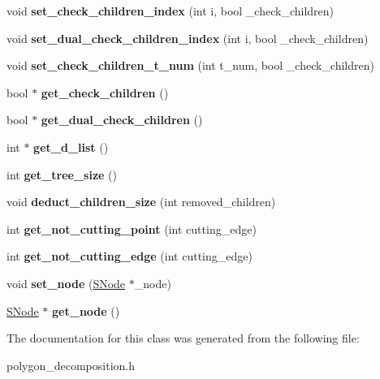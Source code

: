 \begin{DoxyCompactItemize}
\mbox{\label{class_triangle_aec7f124fbe54ae54fec82faf386d1aef}} 
void {\bfseries set\+\_\+check\+\_\+children\+\_\+index} (int i, bool \+\_\+check\+\_\+children)
\item 
\mbox{\label{class_triangle_a1c45e20518c3f28f81cd67760a2baca9}} 
void {\bfseries set\+\_\+dual\+\_\+check\+\_\+children\+\_\+index} (int i, bool \+\_\+check\+\_\+children)
\item 
\mbox{\label{class_triangle_a4ba35f8b0b106d4cc8a3c02bad7e4dfc}} 
void {\bfseries set\+\_\+check\+\_\+children\+\_\+t\+\_\+num} (int t\+\_\+num, bool \+\_\+check\+\_\+children)
\item 
\mbox{\label{class_triangle_aba53c1ca070f663dc2c6242d66a28286}} 
bool $\ast$ {\bfseries get\+\_\+check\+\_\+children} ()
\item 
\mbox{\label{class_triangle_ac71724df2ae4479057fe2c03b3c0bd88}} 
bool $\ast$ {\bfseries get\+\_\+dual\+\_\+check\+\_\+children} ()
\item 
\mbox{\label{class_triangle_ae2a888c585a8217d1896235a4cc2317b}} 
int $\ast$ {\bfseries get\+\_\+d\+\_\+list} ()
\item 
\mbox{\label{class_triangle_a8259cc5d1268ba1b24f7484a46fd9080}} 
int {\bfseries get\+\_\+tree\+\_\+size} ()
\item 
\mbox{\label{class_triangle_ab8e573c415ae1f7b3819461229fe323a}} 
void {\bfseries deduct\+\_\+children\+\_\+size} (int removed\+\_\+children)
\item 
\mbox{\label{class_triangle_a2e2bd8da9ec394145ce7adef04cb1fa0}} 
int {\bfseries get\+\_\+not\+\_\+cutting\+\_\+point} (int cutting\+\_\+edge)
\item 
\mbox{\label{class_triangle_a3854e46cdbb3bc9e555a7b04750fb0e6}} 
int {\bfseries get\+\_\+not\+\_\+cutting\+\_\+edge} (int cutting\+\_\+edge)
\item 
\mbox{\label{class_triangle_a2e5da2d969c99dbd54e4bed2e207f962}} 
void {\bfseries set\+\_\+node} (\mbox{\hyperlink{class_s_node}{S\+Node}} $\ast$\+\_\+node)
\item 
\mbox{\label{class_triangle_a46ef38f2bea9b4bef648183cd05d8d07}} 
\mbox{\hyperlink{class_s_node}{S\+Node}} $\ast$ {\bfseries get\+\_\+node} ()
\end{DoxyCompactItemize}


The documentation for this class was generated from the following file\+:\begin{DoxyCompactItemize}
\item 
polygon\+\_\+decomposition.\+h\end{DoxyCompactItemize}
